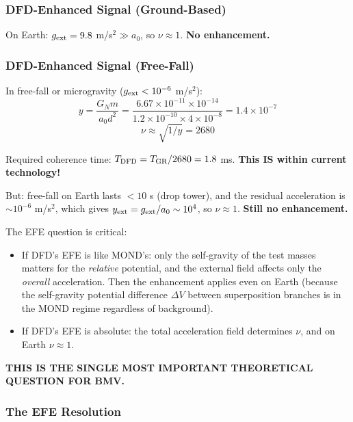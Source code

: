 \documentclass[11pt,a4paper]{article}
\begin{document}
\subsubsection{DFD-Enhanced Signal (Ground-Based)}

On Earth: $g_{\rm ext} = 9.8$ m/s$^2 \gg a_0$, so $\nu \approx 1$. \textbf{No enhancement.}

\subsubsection{DFD-Enhanced Signal (Free-Fall)}

In free-fall or microgravity ($g_{\rm ext} < 10^{-6}$ m/s$^2$):
\begin{equation}
y = \frac{G_N m}{a_0 d^2} = \frac{6.67\times10^{-11}\times10^{-14}}{1.2\times10^{-10}\times4\times10^{-8}} = 1.4\times10^{-7}
\end{equation}
\begin{equation}
\nu \approx \sqrt{1/y} = 2680
\end{equation}

Required coherence time: $T_{\rm DFD} = T_{\rm GR}/2680 = 1.8$ ms. \textbf{This IS within current technology!}

But: free-fall on Earth lasts $< 10$ s (drop tower), and the residual acceleration is $\sim 10^{-6}$ m/s$^2$, which gives $y_{\rm ext} = g_{\rm ext}/a_0 \sim 10^4$, so $\nu \approx 1$. \textbf{Still no enhancement.}

The EFE question is critical:
\begin{itemize}
\item If DFD's EFE is like MOND's: only the self-gravity of the test masses matters for the \emph{relative} potential, and the external field affects only the \emph{overall} acceleration. Then the enhancement applies even on Earth (because the self-gravity potential difference $\Delta V$ between superposition branches is in the MOND regime regardless of background).
\item If DFD's EFE is absolute: the total acceleration field determines $\nu$, and on Earth $\nu \approx 1$.
\end{itemize}

\textbf{THIS IS THE SINGLE MOST IMPORTANT THEORETICAL QUESTION FOR BMV.}

\subsubsection{The EFE Resolution}
\end{document}
